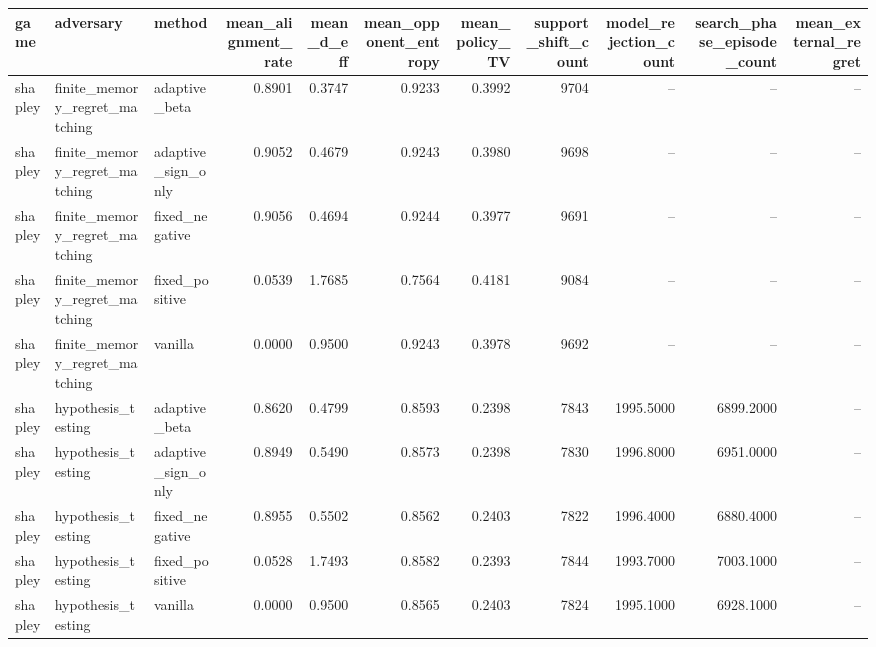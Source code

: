 \begin{tabular}{l l l r r r r r r r r}
\toprule
game & adversary & method & mean\_alignment\_rate & mean\_d\_eff & mean\_opponent\_entropy & mean\_policy\_TV & support\_shift\_count & model\_rejection\_count & search\_phase\_episode\_count & mean\_external\_regret \\
\midrule
shapley & finite\_memory\_regret\_matching & adaptive\_beta & 0.8901 & 0.3747 & 0.9233 & 0.3992 & 9704 & -- & -- & -- \\
shapley & finite\_memory\_regret\_matching & adaptive\_sign\_only & 0.9052 & 0.4679 & 0.9243 & 0.3980 & 9698 & -- & -- & -- \\
shapley & finite\_memory\_regret\_matching & fixed\_negative & 0.9056 & 0.4694 & 0.9244 & 0.3977 & 9691 & -- & -- & -- \\
shapley & finite\_memory\_regret\_matching & fixed\_positive & 0.0539 & 1.7685 & 0.7564 & 0.4181 & 9084 & -- & -- & -- \\
shapley & finite\_memory\_regret\_matching & vanilla & 0.0000 & 0.9500 & 0.9243 & 0.3978 & 9692 & -- & -- & -- \\
shapley & hypothesis\_testing & adaptive\_beta & 0.8620 & 0.4799 & 0.8593 & 0.2398 & 7843 & 1995.5000 & 6899.2000 & -- \\
shapley & hypothesis\_testing & adaptive\_sign\_only & 0.8949 & 0.5490 & 0.8573 & 0.2398 & 7830 & 1996.8000 & 6951.0000 & -- \\
shapley & hypothesis\_testing & fixed\_negative & 0.8955 & 0.5502 & 0.8562 & 0.2403 & 7822 & 1996.4000 & 6880.4000 & -- \\
shapley & hypothesis\_testing & fixed\_positive & 0.0528 & 1.7493 & 0.8582 & 0.2393 & 7844 & 1993.7000 & 7003.1000 & -- \\
shapley & hypothesis\_testing & vanilla & 0.0000 & 0.9500 & 0.8565 & 0.2403 & 7824 & 1995.1000 & 6928.1000 & -- \\
\bottomrule
\end{tabular}